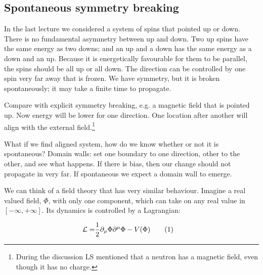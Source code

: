 \documentclass[]{article}
\newcommand\numberthis{\addtocounter{equation}{1}\tag{\theequation}}
\begin{document}
\subsection{Spontaneous symmetry breaking}
In the last lecture we considered a system of spins that pointed up or down.
There is no fundamental asymmetry between up and down. Two up spins have the same energy as two downs; and an up and a down has the same energy as a down and an up. Because it is energetically favourable for them to be parallel, the spins should be all up or all down. The direction can be controlled by one spin very far away that is frozen. We have symmetry, but it is broken spontaneously; it may take a finite time to propagate.

Compare with explicit symmetry breaking, e.g. a magnetic field that is pointed up. Now energy will be lower for one direction. One location after another will align with the external field.\footnote{During the discussion LS mentioned that a neutron has a magnetic field, even though it has no charge.}

What if we find aligned system, how do we know whether or not it is spontaneous? Domain walls: set one boundary to one direction, other to the other, and see what happens. If there is bias, then our change should not propagate in very far. If spontaneous we expect a domain wall to emerge.

We can think of a field theory that has very similar behaviour. Imagine a real valued field, $\Phi$, with only one component, which can take on any real value in $[-\infty,+\infty]$. Its dynamics is controlled by a Lagrangian:

\begin{align*}
	\mathcal{L} =& \frac{1}{2} \partial_\mu \Phi \partial^\mu \Phi - V(\Phi) \numberthis \label{eq:spontaneous:symmetry:L}
\end{align*}
\end{document}
